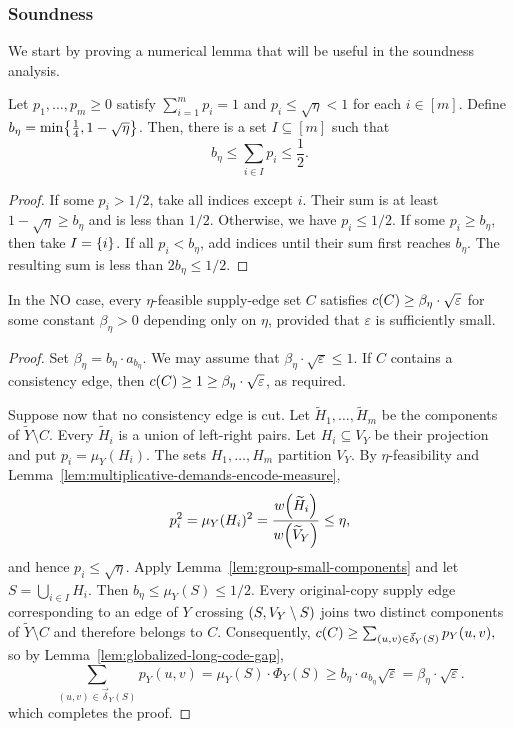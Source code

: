\subsubsection{Soundness}
We start by proving a numerical lemma that will be useful in the soundness analysis.
\begin{lemma}\label{lem:group-small-components}
    Let $p_1,\ldots,p_m\geq0$ satisfy $
        \sum_{i=1}^{m}p_i=1$ and $
        p_i\leq\sqrt{\eta}<1$ for each $i\in[m]$.
    Define $b_\eta=\min\mathopen{}\left\{ \frac{1}{4},1-\sqrt{\eta} \right\}$.
    Then, there is a set $I\subseteq[m]$ such that
    \[
        b_\eta\leq\sum_{i\in I}p_i\leq\frac{1}{2}.
    \]
\end{lemma}
\begin{proof}
    If some $p_i>1/2$, take all indices except $i$. Their sum is at least $1-\sqrt{\eta}\geq b_\eta$ and is less than $1/2$.
    Otherwise, we have $p_i\leq1/2$. If some $p_i\geq b_\eta$, then take $I=\mathopen{}\left\{ i \right\}$. If all $p_i<b_\eta$, add indices until their sum first reaches $b_\eta$. The resulting sum is less than $2b_\eta\leq1/2$.
\end{proof}

\begin{lemma}\label{lem:sse-gpd-soundness}
    In the NO case, every $\eta$-feasible supply-edge set $C$ satisfies $
        c\mathopen{}\left( C \right)\geq\beta_\eta\cdot\sqrt{\varepsilon}
    $
    for some constant $\beta_\eta>0$ depending only on $\eta$, provided that $\varepsilon$ is sufficiently small.
\end{lemma}
\begin{proof}
    Set $\beta_\eta=b_\eta\cdot a_{b_\eta}$. We may assume that $\beta_\eta\cdot\sqrt{\varepsilon}\leq1$. If $C$ contains a consistency edge, then $c\mathopen{}\left( C \right)\geq1\geq\beta_\eta\cdot\sqrt{\varepsilon}$, as required.

    Suppose now that no consistency edge is cut. Let $\widetilde H_1,\ldots,\widetilde H_m$ be the components of $\widetilde Y\setminus C$. Every $\widetilde H_i$ is a union of left-right pairs. Let $H_i\subseteq V_Y$ be their projection and put $p_i=\mu_Y(H_i)$. The sets $H_1,\ldots,H_m$ partition $V_Y$. By $\eta$-feasibility and Lemma~\ref{lem:multiplicative-demands-encode-measure},
    \[
        p_i^2 = \mu_Y(H_i)^2
        =\frac{w\mathopen{}\left( \widetilde H_i \right)}{w\mathopen{}\left( \widetilde V_Y \right)}
        \leq\eta,
    \]
    and hence $p_i\leq\sqrt{\eta}$. Apply Lemma~\ref{lem:group-small-components} and let $
        S=\bigcup_{i\in I}H_i.$
    Then $b_\eta\leq\mu_Y(S)\leq1/2$. Every original-copy supply edge corresponding to an edge of $Y$ crossing $\mathopen{}\left( S,V_Y\setminus S \right)$ joins two distinct components of $\widetilde Y\setminus C$ and therefore belongs to $C$. Consequently, $
        c\mathopen{}\left( C \right)\geq\sum_{(u,v)\in\vec\delta_Y(S)}p_Y(u,v),
    $ so by Lemma~\ref{lem:globalized-long-code-gap},
    \[
        \sum_{(u,v)\in\vec\delta_Y(S)}p_Y(u,v)
        =\mu_Y(S)\cdot\Phi_Y(S)
        \geq b_\eta\cdot a_{b_\eta}\sqrt{\varepsilon}
        =\beta_\eta\cdot\sqrt{\varepsilon}.
    \]
    which completes the proof.
\end{proof}
